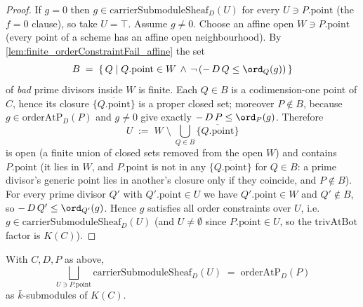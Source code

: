\begin{proof}
  If \(g = 0\) then \(g \in \mathrm{carrierSubmoduleSheaf}_D(U)\) for every
  \(U \ni P.\mathrm{point}\) (the \(f = 0\) clause), so take \(U = \top\).
  Assume \(g \ne 0\). Choose an affine open \(W \ni P.\mathrm{point}\) (every
  point of a scheme has an affine open neighbourhood). By
  \cref{lem:finite_orderConstraintFail_affine} the set
  \[
    B \;=\; \{\, Q \mid Q.\mathrm{point} \in W \,\land\,
      \neg\,(-\,D\,Q \le \ord_Q(g)) \,\}
  \]
  of \emph{bad} prime divisors inside \(W\) is finite. Each \(Q \in B\) is a
  codimension-one point of \(C\), hence its closure \(\overline{\{Q.\mathrm
  {point}\}}\) is a proper closed set; moreover \(P \notin B\), because
  \(g \in \mathrm{orderAtP}_D(P)\) and \(g \ne 0\) give exactly
  \(-\,D\,P \le \ord_P(g)\). Therefore
  \[
    U \;:=\; W \;\setminus\; \bigcup_{Q \in B}
      \overline{\{Q.\mathrm{point}\}}
  \]
  is open (a finite union of closed sets removed from the open \(W\)) and
  contains \(P.\mathrm{point}\) (it lies in \(W\), and \(P.\mathrm{point}\) is
  not in any \(\overline{\{Q.\mathrm{point}\}}\) for \(Q \in B\): a prime
  divisor's generic point lies in another's closure only if they coincide, and
  \(P \notin B\)). For every prime divisor \(Q'\) with \(Q'.\mathrm{point} \in
  U\) we have \(Q'.\mathrm{point} \in W\) and \(Q' \notin B\), so
  \(-\,D\,Q' \le \ord_{Q'}(g)\). Hence \(g\) satisfies all order constraints
  over \(U\), i.e.\ \(g \in \mathrm{carrierSubmoduleSheaf}_D(U)\) (and \(U \ne
  \emptyset\) since \(P.\mathrm{point} \in U\), so the \(\mathrm{trivAtBot}\)
  factor is \(K(C)\)).
\end{proof}

\begin{lemma}

  \label{lem:iSup_carrierSubmoduleSheaf_eq_orderAtPSubmodule}
  With \(C, D, P\) as above,
  \[
    \bigsqcup_{U \ni P.\mathrm{point}}
      \mathrm{carrierSubmoduleSheaf}_D(U) \;=\; \mathrm{orderAtP}_D(P)
  \]
  as \(\bar k\)-submodules of \(K(C)\).
\end{lemma}

